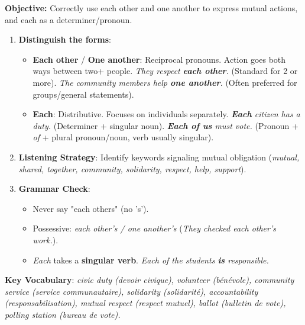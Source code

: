\documentclass[11pt]{article}
\newcommand{\cle}[1]{{\popxbold\color{popdark}#1}}
\begin{document}
\begin{methode}
    \textbf{Objective:} Correctly use \cle{each other} and \cle{one another} to express mutual actions, and \cle{each} as a determiner/pronoun.
    \begin{enumerate}
        \item \textbf{Distinguish the forms}:
              \begin{itemize}
                  \item \textbf{Each other} / \textbf{One another}: \cle{Reciprocal pronouns}. Action goes both ways between two+ people. \textit{They respect \textbf{each other}.} (Standard for 2 or more). \textit{The community members help \textbf{one another}.} (Often preferred for groups/general statements).
                  \item \textbf{Each}: \cle{Distributive}. Focuses on individuals separately. \textit{\textbf{Each} citizen has a duty.} (Determiner + singular noun). \textit{\textbf{Each of us} must vote.} (Pronoun + \emph{of} + plural pronoun/noun, verb usually singular).
              \end{itemize}
        \item \textbf{Listening Strategy}: Identify keywords signaling mutual obligation (\textit{mutual, shared, together, community, solidarity, respect, help, support}).
        \item \textbf{Grammar Check}: 
              \begin{itemize}
                  \item Never say "each others" (no 's').
                  \item Possessive: \textit{each other's / one another's} (\textit{They checked each other's work.}).
                  \item \emph{Each} takes a \textbf{singular verb}. \textit{Each of the students \textbf{is} responsible.}
              \end{itemize}
    \end{enumerate}
    \textbf{Key Vocabulary}: \textit{civic duty (devoir civique), volunteer (bénévole), community service (service communautaire), solidarity (solidarité), accountability (responsabilisation), mutual respect (respect mutuel), ballot (bulletin de vote), polling station (bureau de vote).}
\end{methode}
\end{document}
